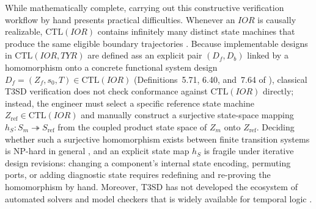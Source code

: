 While mathematically complete, carrying out this constructive verification workflow by hand presents practical difficulties. Whenever an $IOR$ is causally realizable, $\mathrm{CTL}(IOR)$ contains infinitely many distinct state machines that produce the same eligible boundary trajectories \citep{Wymore1993}. Because implementable designs in $\mathrm{CTL}(IOR,TYR)$ are defined ass an explicit pair $(D_f,D_b)$ linked by a homomorphism onto a concrete functional system design $D_f=(Z_f,s_0,T)\in\mathrm{CTL}(IOR)$ (Definitions~5.71, 6.40, and~7.64 of \citet{Wymore1993}), classical T3SD verification does not check conformance against $\mathrm{CTL}(IOR)$ directly; instead, the engineer must select a specific reference state machine $Z_{\mathrm{ref}}\in\mathrm{CTL}(IOR)$ and manually construct a surjective state-space mapping $h_S:S_m\twoheadrightarrow S_{\mathrm{ref}}$ from the coupled product state space of $Z_m$ onto $Z_{\mathrm{ref}}$. Deciding whether such a surjective homomorphism exists between finite transition systems is NP-hard in general \citep{HellNesetril1990,BodirskyKaraMartin2012}, and an explicit state map $h_S$ is fragile under iterative design revisions: changing a component's internal state encoding, permuting ports, or adding diagnostic state requires redefining and re-proving the homomorphism by hand. Moreover, T3SD has not developed the ecosystem of automated solvers and model checkers that is widely available for temporal logic \citep{Pnueli1977,BaierKatoen2008}.

